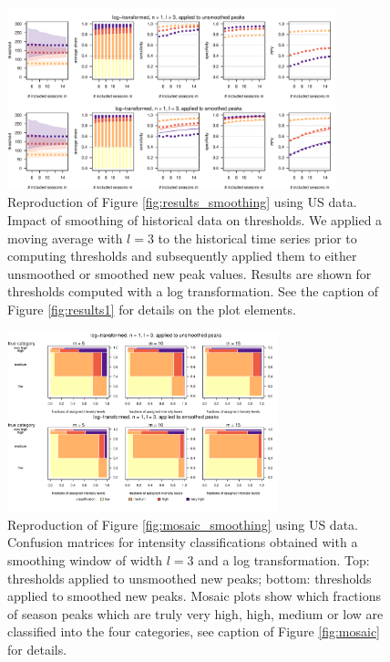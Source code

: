 \documentclass[12pt]{article}
\begin{document}
\begin{figure}[h!]
\centering
\includegraphics[width=0.85\textwidth]{figure/plot_smoothing3_us_small.pdf}

\caption{Reproduction of Figure \ref{fig:results_smoothing} using US data. Impact of smoothing of historical data on thresholds. We applied a moving average with $l = 3$ to the historical time series prior to computing thresholds and subsequently applied them to either unsmoothed or smoothed new peak values. Results are shown for thresholds computed with a log transformation. See the caption of Figure \ref{fig:results1} for details on the plot elements.}
\label{fig:results_smoothing_us}
\end{figure}



\begin{figure}[h!]
\begin{center}
\includegraphics[width=0.7\textwidth]{figure/mosaic_log_smoothed_us.pdf}
\end{center}
\caption{Reproduction of Figure \ref{fig:mosaic_smoothing} using US data. Confusion matrices for intensity classifications obtained with a smoothing window of width $l = 3$ and a log transformation. Top: thresholds applied to unsmoothed new peaks; bottom: thresholds applied to smoothed new peaks. Mosaic plots show which fractions of season peaks which are truly very high, high, medium or low are classified into the four categories, see caption of Figure \ref{fig:mosaic} for details.}
\label{fig:mosaic_smoothing_us}
\end{figure}
\end{document}
